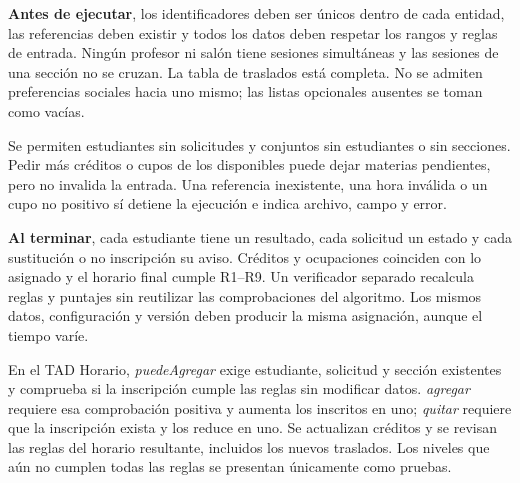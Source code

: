 \textbf{Antes de ejecutar}, los identificadores deben ser únicos dentro de cada entidad, las referencias deben existir y todos los datos deben respetar los rangos y reglas de entrada. Ningún profesor ni salón tiene sesiones simultáneas y las sesiones de una sección no se cruzan. La tabla de traslados está completa. No se admiten preferencias sociales hacia uno mismo; las listas opcionales ausentes se toman como vacías.

Se permiten estudiantes sin solicitudes y conjuntos sin estudiantes o sin secciones. Pedir más créditos o cupos de los disponibles puede dejar materias pendientes, pero no invalida la entrada. Una referencia inexistente, una hora inválida o un cupo no positivo sí detiene la ejecución e indica archivo, campo y error.

\textbf{Al terminar}, cada estudiante tiene un resultado, cada solicitud un estado y cada sustitución o no inscripción su aviso. Créditos y ocupaciones coinciden con lo asignado y el horario final cumple R1--R9. Un verificador separado recalcula reglas y puntajes sin reutilizar las comprobaciones del algoritmo. Los mismos datos, configuración y versión deben producir la misma asignación, aunque el tiempo varíe.

En el TAD Horario, \emph{puedeAgregar} exige estudiante, solicitud y sección existentes y comprueba si la inscripción cumple las reglas sin modificar datos. \emph{agregar} requiere esa comprobación positiva y aumenta los inscritos en uno; \emph{quitar} requiere que la inscripción exista y los reduce en uno. Se actualizan créditos y se revisan las reglas del horario resultante, incluidos los nuevos traslados. Los niveles que aún no cumplen todas las reglas se presentan únicamente como pruebas.
